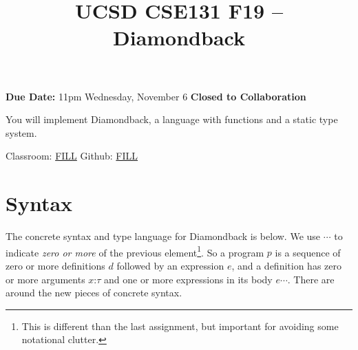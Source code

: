 \documentclass[10pt, oneside]{article}
\title{UCSD CSE131 F19 -- Diamondback}
\begin{document}
\maketitle 

{\bf Due Date:} 11pm Wednesday, November 6 \hspace{2em} {\bf Closed to Collaboration}

You will implement Diamondback, a language with functions and a static type
system.

Classroom: \url{FILL} \hspace{1em} Github: \url{FILL}


\section*{Syntax}

The concrete syntax and type language for Diamondback is below. We use
$\cdots$ to indicate \textit{zero or more} of the previous
element\footnote{This is different than the last assignment, but important
for avoiding some notational clutter.}. So a program $p$ is a sequence of zero
or more definitions $d$ followed by an expression $e$, and a definition has
zero or more arguments $x \texttt{:}\tau$ and one or more expressions in its
body $e \cdots$. There are  around the new pieces of concrete
syntax.
\end{document}

